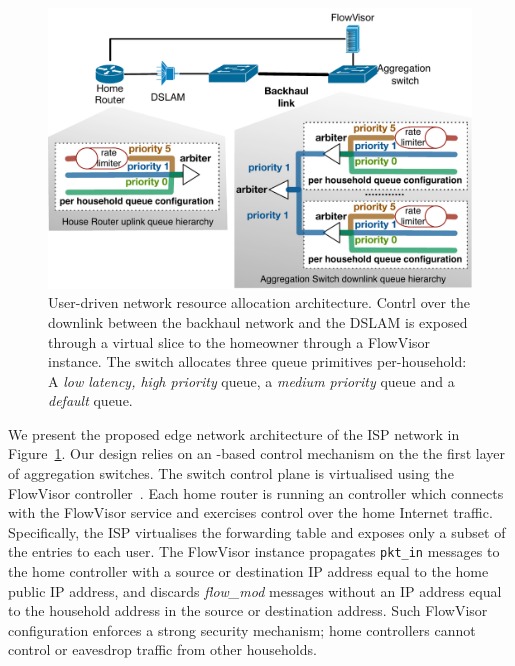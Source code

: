 \begin{figure}
  \centering
  \includegraphics[width=0.7\columnwidth]{queue_design}
  \caption{User-driven network resource allocation architecture. 
    \label{fig:queue_design} Contrl over the downlink between the backhaul
    network and the DSLAM is exposed through a 
    virtual slice to the homeowner through a FlowVisor instance.  The switch
    allocates three queue primitives per-household: A {\it low latency,
      high priority} \/queue, a {\it medium priority} \/queue and a {\it default}
    \/queue.}
\end{figure}

We present the proposed edge network architecture of the ISP network in
Figure~\ref{fig:queue_design}.  Our design relies on an \of-based control
mechanism on the the first layer of aggregation switches.  The switch control
plane is virtualised using the FlowVisor controller~\cite{flowvisor-osdi}. Each
home router is running an \of controller which connects with the FlowVisor service
and exercises control over the home Internet traffic. Specifically, the ISP
virtualises the \of forwarding table and exposes only a subset of the entries to
each user.  The FlowVisor instance propagates {\tt pkt\_in} messages to the home
controller with a source or destination IP address equal to the home public IP
address, and discards {\it flow\_mod} messages without an IP address equal to
the household address in the
source or destination address. 
Such FlowVisor configuration enforces a strong security mechanism;
home controllers cannot control or eavesdrop traffic from other households. 

